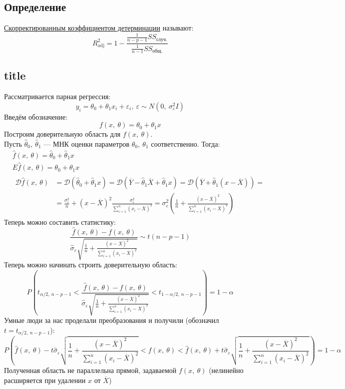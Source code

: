 \documentclass[12pt, a4paper]{article}
\newcommand{\dev}{\mathcal{D}}
\begin{document}
\subsection*{Определение}
\underline{Скорректированным коэффициентом детерминации} называют:
\[
R^2_{\text{adj}} = 1 - \frac{ \frac{1}{n - p - 1} SS_{\text{случ.}} }{ \frac{1}{n - 1} SS_{\text{общ.}} }
\]
\subsection*{title}
Рассматривается парная регрессия:
\[
y_i =  \theta_0 + \theta_1 x_i + \varepsilon_i,\ \varepsilon \sim N(0,\ \sigma_{\varepsilon}^2 I)
\]
Введём обозначение:
\[
f(x,\ \theta) = \theta_0 + \theta_1 x
\]
Построим доверительную область для $f(x,\ \theta)$.\\
Пусть $\hat \theta_0,\ \hat\theta_1$ --- МНК оценки параметров $\theta_0,\ \theta_1$ соответственно. Тогда:
\[
\begin{aligned}
    & \hat f(x,\ \theta) = \hat \theta_0 + \hat\theta_1 x\\
    & E\hat f(x,\ \theta) = \theta_0 + \theta_1 x\\
    &\begin{aligned}
        \dev \hat f(x,\ \theta) &= \dev \left( \hat \theta_0 + \hat \theta_1 x \right) = \dev \left( \overline{Y} - \hat \theta_1 \overline{X} + \hat \theta_1 x \right) = \dev \left( \overline{Y} + \hat \theta_1 \left( x - \overline{X} \right) \right) =\\
        &= \frac{\sigma^2_{\varepsilon}}{n} + {\left( x - \overline{X} \right)}^2 \frac{\sigma^2_{\varepsilon}}{\sum_{i = 1}^{n} {\left( x_i - \overline{X} \right)}^2} =  \sigma^2_{\varepsilon} \left( \frac{1}{n} + \frac{{\left( x - \overline{X} \right)}^2}{ \sum_{i = 1}^{n} {\left( x_i - \overline{X} \right)}^2 } \right)
    \end{aligned}
\end{aligned}
\]
Теперь можно составить статистику:
\[
\frac{\hat f(x,\ \theta) - f(x,\ \theta)}{ \hat \sigma_{\varepsilon} \sqrt{ \frac{1}{n} + \frac{{\left( x - \overline{X} \right)}^2}{ \sum_{i = 1}^{n} {\left( x_i - \overline{X} \right)}^2 } } } \sim t(n - p - 1)
\]
Теперь можно начинать строить доверительную область:
\[
P\left( t_{\alpha/2,\ n - p - 1} < \frac{\hat f(x,\ \theta) - f(x,\ \theta)}{ \hat \sigma_{\varepsilon} \sqrt{ \frac{1}{n} + \frac{{\left( x - \overline{X} \right)}^2}{ \sum_{i = 1}^{n} {\left( x_i - \overline{X} \right)}^2 } } } < t_{1 - \alpha/2,\ n - p - 1} \right) = 1 - \alpha
\]
Умные люди за нас проделали преобразования и получили (обозначил $t = t_{\alpha/2,\ n - p- 1}$):
\[
P\left( \hat f(x,\ \theta) - t \hat \sigma_{\varepsilon} \sqrt{ \frac{1}{n} + \frac{{\left( x - \overline{X} \right)}^2}{ \sum_{i = 1}^{n} {\left( x_i - \overline{X} \right)}^2 } } < f(x,\ \theta) < \hat f(x,\ \theta) + t \hat \sigma_{\varepsilon} \sqrt{ \frac{1}{n} + \frac{{\left( x - \overline{X} \right)}^2}{ \sum_{i = 1}^{n} {\left( x_i - \overline{X} \right)}^2 } } \right) = 1 - \alpha
\]
Полученная область не параллельна прямой, задаваемой $f(x,\ \theta)$ (нелинейно расширяется при удалении $x$ от $\overline{X}$)
\end{document}
